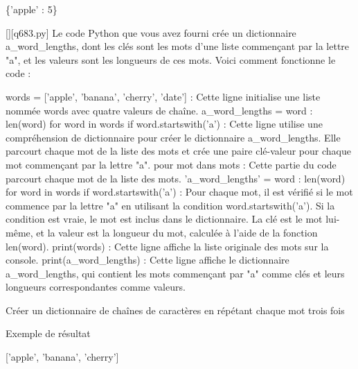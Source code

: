 \{'apple' : 5\}
        \par
        \begin{solution}
            \renewcommand{\nomfichier}{q683.py}
            \pythonfile{\chemincode \nomfichier}[][\nomfichier]
            Le code Python que vous avez fourni crée un dictionnaire a_word_lengths, dont les clés sont les mots d'une liste commençant par la lettre "a", et les valeurs sont les longueurs de ces mots. Voici comment fonctionne le code :

    words = ['apple', 'banana', 'cherry', 'date'] : Cette ligne initialise une liste nommée words avec quatre valeurs de chaîne.
    a_word_lengths = {word : len(word) for word in words if word.startswith('a')} : Cette ligne utilise une compréhension de dictionnaire pour créer le dictionnaire a_word_lengths. Elle parcourt chaque mot de la liste des mots et crée une paire clé-valeur pour chaque mot commençant par la lettre "a".
        pour mot dans mots : Cette partie du code parcourt chaque mot de la liste des mots.
        'a_word_lengths' = {word : len(word) for word in words if word.startswith('a')} : Pour chaque mot, il est vérifié si le mot commence par la lettre "a" en utilisant la condition word.startswith('a'). Si la condition est vraie, le mot est inclus dans le dictionnaire. La clé est le mot lui-même, et la valeur est la longueur du mot, calculée à l'aide de la fonction len(word).
    print(words) : Cette ligne affiche la liste originale des mots sur la console.
    print(a_word_lengths) : Cette ligne affiche le dictionnaire a_word_lengths, qui contient les mots commençant par "a" comme clés et leurs longueurs correspondantes comme valeurs.
        \end{solution}
        

        \question
        Créer un dictionnaire de chaînes de caractères en répétant chaque mot trois fois

Exemple de résultat

['apple', 'banana', 'cherry']

